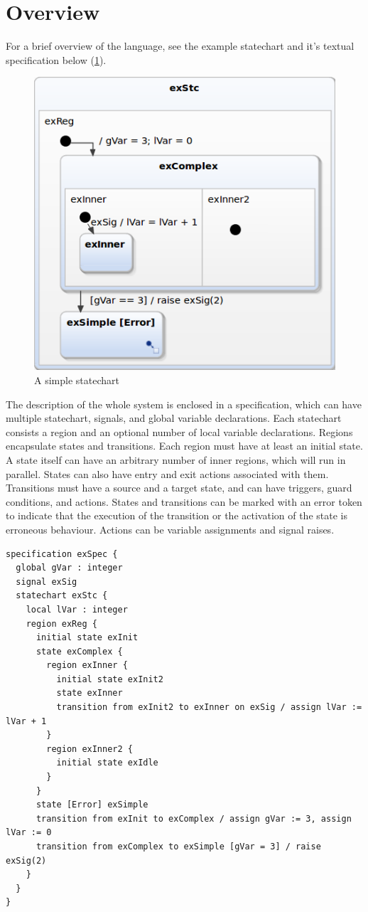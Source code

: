 \section{Overview}
For a brief overview of the language, see the example statechart and it's textual specification below (\cref{fig:verif}).
\begin{figure}[H]
	\centering
	\includegraphics[width=0.65\linewidth]{include/figures/chapter_4/stcex}
	\caption{A simple statechart}
	\label{fig:verif}
\end{figure}

The description of the whole system is enclosed in a specification, which can have multiple statechart, signals, and global variable declarations. Each statechart consists a region and an optional number of local variable declarations. Regions encapsulate states and transitions. Each region must have at least an initial state. A state itself can have an arbitrary number of inner regions, which will run in parallel. States can also have entry and exit actions associated with them. Transitions must have a source and a target state, and can have triggers, guard conditions, and actions. States and transitions can be marked with an error token to indicate that the execution of the transition or the activation of the state is erroneous behaviour. Actions can be variable assignments and signal raises.

\begin{lstlisting}
specification exSpec {
  global gVar : integer
  signal exSig
  statechart exStc {
    local lVar : integer
    region exReg {
      initial state exInit
      state exComplex {
        region exInner {
          initial state exInit2
          state exInner
          transition from exInit2 to exInner on exSig / assign lVar := lVar + 1
        }
        region exInner2 {
          initial state exIdle
        }
      }
      state [Error] exSimple
      transition from exInit to exComplex / assign gVar := 3, assign lVar := 0
      transition from exComplex to exSimple [gVar = 3] / raise exSig(2)
    }
  }
}
\end{lstlisting}


